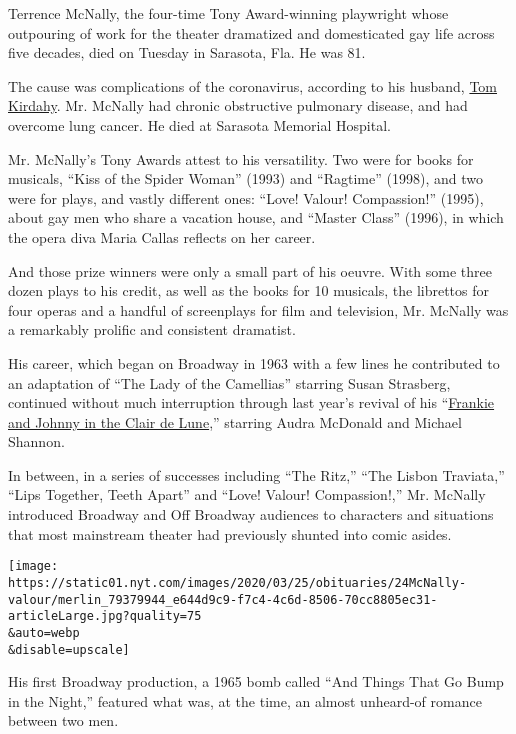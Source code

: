 Terrence McNally, the four-time Tony Award-winning playwright whose
outpouring of work for the theater dramatized and domesticated gay life
across five decades, died on Tuesday in Sarasota, Fla. He was 81.

The cause was complications of the coronavirus, according to his
husband,
\href{https://www.nytimes.com/2017/11/15/fashion/weddings/tom-kirdahy-and-terrence-mcnally-an-immediate-and-lasting-need.html}{Tom
Kirdahy}. Mr. McNally had chronic obstructive pulmonary disease, and had
overcome lung cancer. He died at Sarasota Memorial Hospital.

Mr. McNally's Tony Awards attest to his versatility. Two were for books
for musicals, ``Kiss of the Spider Woman'' (1993) and ``Ragtime''
(1998), and two were for plays, and vastly different ones: ``Love!
Valour! Compassion!'' (1995), about gay men who share a vacation house,
and ``Master Class'' (1996), in which the opera diva Maria Callas
reflects on her career.

And those prize winners were only a small part of his oeuvre. With some
three dozen plays to his credit, as well as the books for 10 musicals,
the librettos for four operas and a handful of screenplays for film and
television, Mr. McNally was a remarkably prolific and consistent
dramatist.

His career, which began on Broadway in 1963 with a few lines he
contributed to an adaptation of ``The Lady of the Camellias'' starring
Susan Strasberg, continued without much interruption through last year's
revival of his
``\href{https://www.nytimes.com/2019/05/30/theater/frankie-and-johnny-review-audra-mcdonald.html}{Frankie
and Johnny in the Clair de Lune},'' starring Audra McDonald and Michael
Shannon.

In between, in a series of successes including ``The Ritz,'' ``The
Lisbon Traviata,'' ``Lips Together, Teeth Apart'' and ``Love! Valour!
Compassion!,'' Mr. McNally introduced Broadway and Off Broadway
audiences to characters and situations that most mainstream theater had
previously shunted into comic asides.

\texttt{[image: https://static01.nyt.com/images/2020/03/25/obituaries/24McNally-valour/merlin\_79379944\_e644d9c9-f7c4-4c6d-8506-70cc8805ec31-articleLarge.jpg?quality=75\\\&auto=webp\\\&disable=upscale]}

His first Broadway production, a 1965 bomb called ``And Things That Go
Bump in the Night,'' featured what was, at the time, an almost
unheard-of romance between two men.

